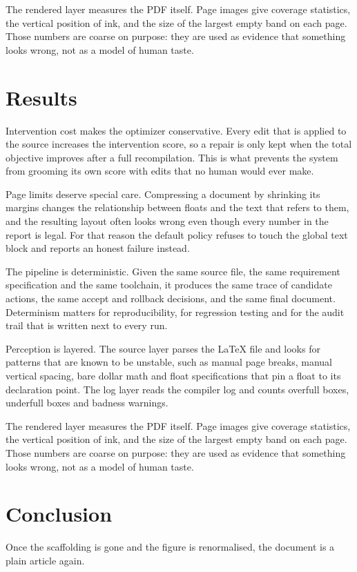 \documentclass[10pt,a4paper]{article}
\begin{document}
The rendered layer measures the PDF itself. Page images give coverage statistics, the vertical position of ink, and the size of the largest empty band on each page. Those numbers are coarse on purpose: they are used as evidence that something looks wrong, not as a model of human taste.


\section{Results}
Intervention cost makes the optimizer conservative. Every edit that is applied to the source increases the intervention score, so a repair is only kept when the total objective improves after a full recompilation. This is what prevents the system from grooming its own score with edits that no human would ever make.

Page limits deserve special care. Compressing a document by shrinking its margins changes the relationship between floats and the text that refers to them, and the resulting layout often looks wrong even though every number in the report is legal. For that reason the default policy refuses to touch the global text block and reports an honest failure instead.

The pipeline is deterministic. Given the same source file, the same requirement specification and the same toolchain, it produces the same trace of candidate actions, the same accept and rollback decisions, and the same final document. Determinism matters for reproducibility, for regression testing and for the audit trail that is written next to every run.

Perception is layered. The source layer parses the LaTeX file and looks for patterns that are known to be unstable, such as manual page breaks, manual vertical spacing, bare dollar math and float specifications that pin a float to its declaration point. The log layer reads the compiler log and counts overfull boxes, underfull boxes and badness warnings.

The rendered layer measures the PDF itself. Page images give coverage statistics, the vertical position of ink, and the size of the largest empty band on each page. Those numbers are coarse on purpose: they are used as evidence that something looks wrong, not as a model of human taste.


\section{Conclusion}
Once the scaffolding is gone and the figure is renormalised, the document is a
plain article again.
\end{document}
